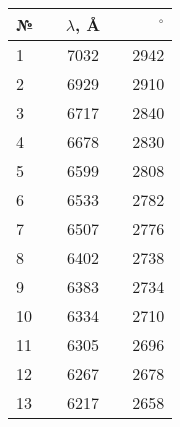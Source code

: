 \begin{tabular}{lcccr}
\toprule
№ & {\hspace{0.5cm}} & $\lambda$, Å & {\hspace{0.5cm}} & $^\circ$ \\
\midrule
1  & {} & 7032 & {} & 2942 \\
2  & {} & 6929 & {} & 2910 \\
3  & {} & 6717 & {} & 2840 \\
4  & {} & 6678 & {} & 2830 \\
5  & {} & 6599 & {} & 2808 \\
6  & {} & 6533 & {} & 2782 \\
7  & {} & 6507 & {} & 2776 \\
8  & {} & 6402 & {} & 2738 \\
9  & {} & 6383 & {} & 2734 \\
10 & {} & 6334 & {} & 2710 \\
11 & {} & 6305 & {} & 2696 \\
12 & {} & 6267 & {} & 2678 \\
13 & {} & 6217 & {} & 2658 \\
\bottomrule
\end{tabular}
